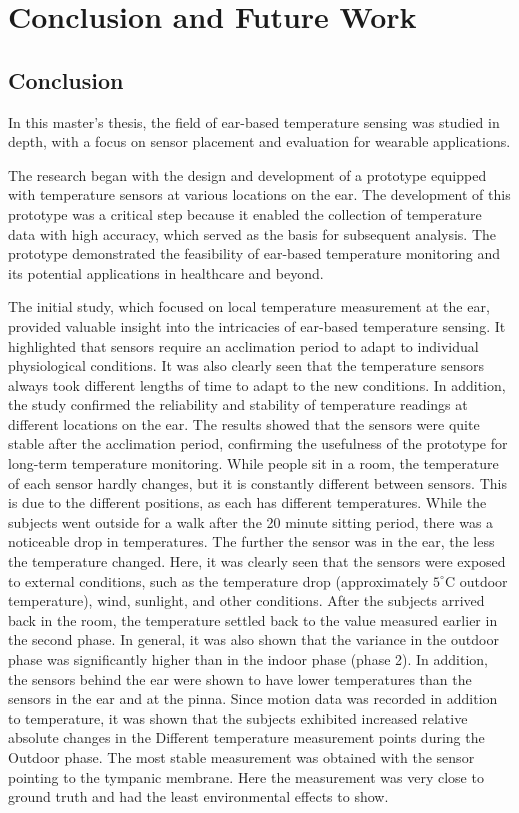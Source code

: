 \chapter{Conclusion and Future Work}
\label{ch:Conclusion}

\section{Conclusion}
In this master's thesis, the field of ear-based temperature sensing was studied in depth, with a focus on sensor placement and evaluation for wearable applications. 

The research began with the design and development of a prototype equipped with temperature sensors at various locations on the ear. 
The development of this prototype was a critical step because it enabled the collection of temperature data with high accuracy, which served as the basis for subsequent analysis. 
The prototype demonstrated the feasibility of ear-based temperature monitoring and its potential applications in healthcare and beyond.

The initial study, which focused on local temperature measurement at the ear, provided valuable insight into the intricacies of ear-based temperature sensing. 
It highlighted that sensors require an acclimation period to adapt to individual physiological conditions. 
It was also clearly seen that the temperature sensors always took different lengths of time to adapt to the new conditions.
In addition, the study confirmed the reliability and stability of temperature readings at different locations on the ear. 
The results showed that the sensors were quite stable after the acclimation period, confirming the usefulness of the prototype for long-term temperature monitoring.
While people sit in a room, the temperature of each sensor hardly changes, but it is constantly different between sensors.
This is due to the different positions, as each has different temperatures.
While the subjects went outside for a walk after the 20 minute sitting period, there was a noticeable drop in temperatures. 
The further the sensor was in the ear, the less the temperature changed.
Here, it was clearly seen that the sensors were exposed to external conditions, such as the temperature drop (approximately $5^\circ\text{C}$ outdoor temperature), wind, sunlight, and other conditions.
After the subjects arrived back in the room, the temperature settled back to the value measured earlier in the second phase.
In general, it was also shown that the variance in the outdoor phase was significantly higher than in the indoor phase (phase 2).
In addition, the sensors behind the ear were shown to have lower temperatures than the sensors in the ear and at the pinna.
Since motion data was recorded in addition to temperature, it was shown that the subjects exhibited increased relative absolute changes in the Different temperature measurement points during the Outdoor phase.
The most stable measurement was obtained with the sensor pointing to the tympanic membrane. 
Here the measurement was very close to ground truth and had the least environmental effects to show.

